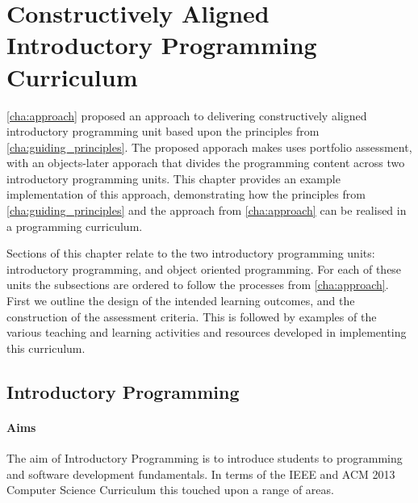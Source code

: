 
\chapter{Constructively Aligned Introductory Programming Curriculum} %
\label{cha:example_impl}

\cref{cha:approach} proposed an approach to delivering constructively aligned introductory programming unit based upon the principles from \cref{cha:guiding_principles}. The proposed apporach makes uses portfolio assessment, with an objects-later apporach that divides the programming content across two introductory programming units. This chapter provides an example implementation of this approach, demonstrating how the principles from \cref{cha:guiding_principles} and the approach from \cref{cha:approach} can be realised in a programming curriculum.

Sections of this chapter relate to the two introductory programming units: introductory programming, and object oriented programming. For each of these units the subsections are ordered to follow the processes from \cref{cha:approach}. First we outline the design of the intended learning outcomes, and the construction of the assessment criteria. This is followed by examples of the various teaching and learning activities and resources developed in implementing this curriculum.  


\section{Introductory Programming} %
\label{sec:introductory_programming}

\subsubsection{Aims} %
\label{ssub:intro:aims}

The aim of Introductory Programming is to introduce students to programming and software development fundamentals. In terms of the IEEE and ACM 2013 Computer Science Curriculum \cite{CSC2013} this touched upon a range of areas.

